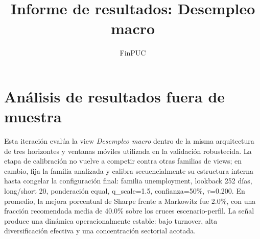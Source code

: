 \documentclass[11pt]{article}
\title{Informe de resultados: Desempleo macro}
\author{FinPUC}
\date{}
\begin{document}
\maketitle

\section{Análisis de resultados fuera de muestra}
Esta iteración evalúa la view \textit{Desempleo macro} dentro de la misma arquitectura de tres horizontes y ventanas móviles utilizada en la validación robustecida. La etapa de calibración no vuelve a competir contra otras familias de views; en cambio, fija la familia analizada y calibra secuencialmente su estructura interna hasta congelar la configuración final: familia unemployment, lookback 252 días, long/short 20, ponderación equal, q\_scale=1.5, confianza=50\%, $\tau$=0.200.
En promedio, la mejora porcentual de Sharpe frente a Markowitz fue 2.0\%, con una fracción recomendada media de 40.0\% sobre los cruces escenario-perfil. La señal produce una dinámica operacionalmente estable: bajo turnover, alta diversificación efectiva y una concentración sectorial acotada.
\begin{table}[H]
\centering
{}
\caption{Comparación fuera de muestra en horizonte limpio para Desempleo macro.}
\label{tab:desempleo_macro:resultados_oos}
\end{table}
\end{document}
